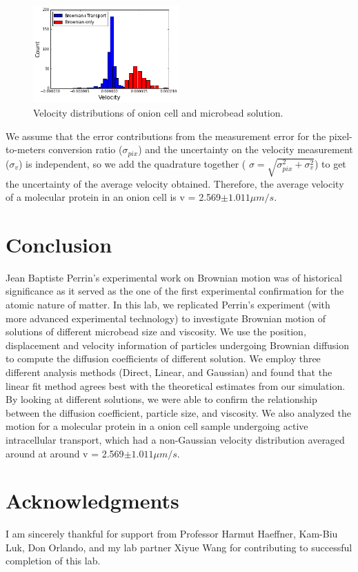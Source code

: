 \documentclass[iop,revtex4]{emulateapj_mod}
\begin{document}
\begin{figure}[h]
\includegraphics[width=0.50\textwidth]{plots/histo.png}
\caption{Velocity distributions of onion cell and microbead solution.}
\label{histo}
\end{figure} 
\par We assume that the error contributions from the measurement error for the pixel-to-meters conversion ratio ($\sigma_{pix}$) and the uncertainty on the velocity measurement  ($\sigma_{v}$) is independent, so we add the quadrature together ( $\sigma= \sqrt{\sigma_{pix}^2+\sigma_{v}^2}$) to get the uncertainty of the average velocity obtained. Therefore, the average velocity of a molecular protein in an onion cell is  v = 2.569$ \pm 1.011 \mu m/s$.
\section{Conclusion}\label{sec:conclusion}
\par Jean Baptiste Perrin's experimental work on Brownian motion was of historical significance as it served as the one of the first experimental confirmation for the atomic nature of matter. In this lab, we replicated Perrin's experiment (with more advanced experimental technology) to investigate Brownian motion of  solutions of different microbead size and viscosity. We use the position, displacement and velocity information of particles undergoing Brownian diffusion to compute the diffusion coefficients of different solution. We employ three different analysis methods (Direct, Linear, and Gaussian) and found that the linear fit method agrees best with the theoretical estimates from our simulation. By looking at different solutions, we were able to confirm the relationship between the diffusion coefficient, particle size, and viscosity. We also analyzed the motion for a  molecular protein in a onion cell sample undergoing active intracellular transport, which had a non-Gaussian velocity distribution averaged around  at around v = 2.569$ \pm 1.011 \mu m/s$.

\acknowledgments
\section*{Acknowledgments}
I am sincerely thankful for support from Professor Harmut Haeffner, Kam-Biu Luk, Don Orlando, and my lab partner Xiyue Wang for contributing to successful completion of this lab.

\end{document}
